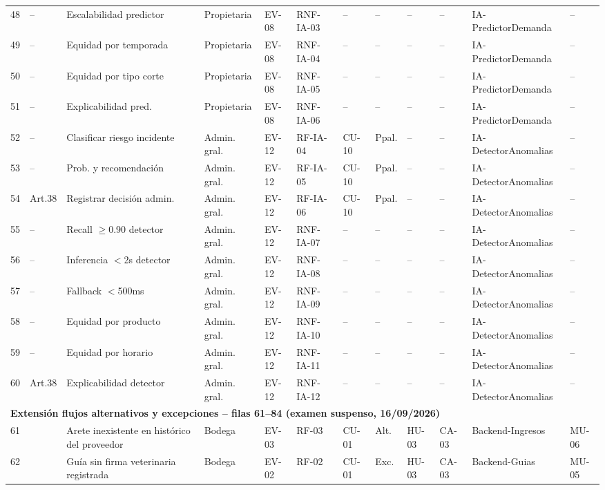 \documentclass[11pt,a4paper]{article}
\begin{document}
\begin{longtable}{|p{0.3cm}|p{1.0cm}|p{1.9cm}|p{1.3cm}|p{0.6cm}|p{0.7cm}|p{0.6cm}|p{1.1cm}|p{0.6cm}|p{0.6cm}|p{2.0cm}|p{0.8cm}|}
48 & -- & Escalabilidad predictor & Propietaria & EV-08 & RNF-IA-03 & -- & -- & -- & -- & IA-PredictorDemanda & -- \\
49 & -- & Equidad por temporada & Propietaria & EV-08 & RNF-IA-04 & -- & -- & -- & -- & IA-PredictorDemanda & -- \\
50 & -- & Equidad por tipo corte & Propietaria & EV-08 & RNF-IA-05 & -- & -- & -- & -- & IA-PredictorDemanda & -- \\
51 & -- & Explicabilidad pred. & Propietaria & EV-08 & RNF-IA-06 & -- & -- & -- & -- & IA-PredictorDemanda & -- \\
52 & -- & Clasificar riesgo incidente & Admin. gral. & EV-12 & RF-IA-04 & CU-10 & Ppal. & -- & -- & IA-DetectorAnomalias & -- \\
53 & -- & Prob. y recomendación & Admin. gral. & EV-12 & RF-IA-05 & CU-10 & Ppal. & -- & -- & IA-DetectorAnomalias & -- \\
54 & Art.38 & Registrar decisión admin. & Admin. gral. & EV-12 & RF-IA-06 & CU-10 & Ppal. & -- & -- & IA-DetectorAnomalias & -- \\
55 & -- & Recall $\geq$0.90 detector & Admin. gral. & EV-12 & RNF-IA-07 & -- & -- & -- & -- & IA-DetectorAnomalias & -- \\
56 & -- & Inferencia $<$2s detector & Admin. gral. & EV-12 & RNF-IA-08 & -- & -- & -- & -- & IA-DetectorAnomalias & -- \\
57 & -- & Fallback $<$500ms & Admin. gral. & EV-12 & RNF-IA-09 & -- & -- & -- & -- & IA-DetectorAnomalias & -- \\
58 & -- & Equidad por producto & Admin. gral. & EV-12 & RNF-IA-10 & -- & -- & -- & -- & IA-DetectorAnomalias & -- \\
59 & -- & Equidad por horario & Admin. gral. & EV-12 & RNF-IA-11 & -- & -- & -- & -- & IA-DetectorAnomalias & -- \\
60 & Art.38 & Explicabilidad detector & Admin. gral. & EV-12 & RNF-IA-12 & -- & -- & -- & -- & IA-DetectorAnomalias & -- \\
\hline
\multicolumn{12}{|l|}{\textbf{Extensión flujos alternativos y excepciones -- filas 61--84 (examen suspenso, 16/09/2026)}} \\
\hline
61 &  & Arete inexistente en histórico del proveedor & Bodega & EV-03 & RF-03 & CU-01 & Alt. & HU-03 & CA-03 & Backend-Ingresos & MU-06 \\
62 &  & Guía sin firma veterinaria registrada & Bodega & EV-02 & RF-02 & CU-01 & Exc. & HU-03 & CA-03 & Backend-Guias & MU-05 \\

\end{longtable}
\end{document}
